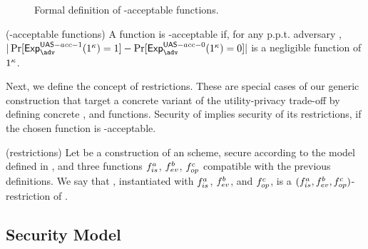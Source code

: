 \begin{figure}[ht!]
  \centering  
  \label{fig:uas-acceptable}
  \caption{Formal definition of \UAS-acceptable \fissue functions.}
\end{figure}

\begin{definition}{(\UAS-acceptable \fissue functions)}
  \label{def:uas-acc-func}
  A \fissue function is \UAS-acceptable if, for any p.p.t. adversary \adv,
  $|\Pr[\Exp^{\UAS-acc-1}_\adv(1^\secpar)=1]-\Pr[\Exp^{\UAS-acc-0}_\adv
  (1^\secpar)=0]|$ is a negligible function of $1^\kappa$.
\end{definition}

Next, we define the concept of \CUASGen restrictions. These are special
cases of our generic construction that target a concrete variant of the
utility-privacy trade-off by defining concrete \fissue, \feval and \finsp
functions. Security of \CUASGen implies security of its restrictions, if
the chosen \fissue function is \CUASGen-acceptable.

\begin{definition}{(\CUASGen restrictions)}
  \label{def:uas-restrictions}
  Let \CUASGen be a construction of an \UAS scheme, secure according to
  the model defined in , and three functions $f_{is}^a$,
  $f_{ev}^b$, $f_{op}^c$ compatible with the previous definitions. We say that
  \CUASGen, instantiated with $f_{is}^a$, $f_{ev}^b$, and $f_{op}^c$, is a
  $(f_{is}^a,f_{ev}^b,f_{op}^c)$-restriction of \CUASGen.
\end{definition}

\subsection{Security Model}
\label{ssec:model-uas}

